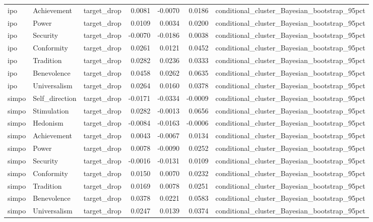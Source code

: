 \begin{tabular}{lllrrrl}
ipo & Achievement & target\_drop & 0.0081 & -0.0070 & 0.0186 & conditional\_cluster\_Bayesian\_bootstrap\_95pct \\
ipo & Power & target\_drop & 0.0109 & 0.0034 & 0.0200 & conditional\_cluster\_Bayesian\_bootstrap\_95pct \\
ipo & Security & target\_drop & -0.0070 & -0.0186 & 0.0038 & conditional\_cluster\_Bayesian\_bootstrap\_95pct \\
ipo & Conformity & target\_drop & 0.0261 & 0.0121 & 0.0452 & conditional\_cluster\_Bayesian\_bootstrap\_95pct \\
ipo & Tradition & target\_drop & 0.0282 & 0.0236 & 0.0333 & conditional\_cluster\_Bayesian\_bootstrap\_95pct \\
ipo & Benevolence & target\_drop & 0.0458 & 0.0262 & 0.0635 & conditional\_cluster\_Bayesian\_bootstrap\_95pct \\
ipo & Universalism & target\_drop & 0.0264 & 0.0160 & 0.0378 & conditional\_cluster\_Bayesian\_bootstrap\_95pct \\
simpo & Self\_direction & target\_drop & -0.0171 & -0.0334 & -0.0009 & conditional\_cluster\_Bayesian\_bootstrap\_95pct \\
simpo & Stimulation & target\_drop & 0.0282 & -0.0013 & 0.0656 & conditional\_cluster\_Bayesian\_bootstrap\_95pct \\
simpo & Hedonism & target\_drop & -0.0084 & -0.0163 & -0.0006 & conditional\_cluster\_Bayesian\_bootstrap\_95pct \\
simpo & Achievement & target\_drop & 0.0043 & -0.0067 & 0.0134 & conditional\_cluster\_Bayesian\_bootstrap\_95pct \\
simpo & Power & target\_drop & 0.0078 & -0.0090 & 0.0252 & conditional\_cluster\_Bayesian\_bootstrap\_95pct \\
simpo & Security & target\_drop & -0.0016 & -0.0131 & 0.0109 & conditional\_cluster\_Bayesian\_bootstrap\_95pct \\
simpo & Conformity & target\_drop & 0.0150 & 0.0070 & 0.0232 & conditional\_cluster\_Bayesian\_bootstrap\_95pct \\
simpo & Tradition & target\_drop & 0.0169 & 0.0078 & 0.0251 & conditional\_cluster\_Bayesian\_bootstrap\_95pct \\
simpo & Benevolence & target\_drop & 0.0378 & 0.0221 & 0.0583 & conditional\_cluster\_Bayesian\_bootstrap\_95pct \\
simpo & Universalism & target\_drop & 0.0247 & 0.0139 & 0.0374 & conditional\_cluster\_Bayesian\_bootstrap\_95pct \\

\end{tabular}
